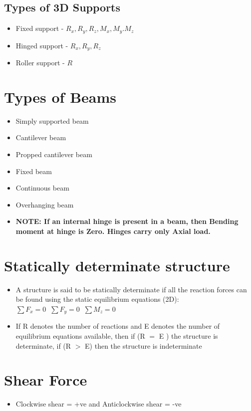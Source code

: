 \documentclass[8pt]{report}
\begin{document}
		\subsection{Types of 3D Supports}
			\begin{itemize}
				\item Fixed support - $R_x,R_y,R_z,M_x,M_y.M_z$
				\item Hinged support - $R_x,R_y,R_z$
				\item Roller support - $R$
			\end{itemize}\hrulefill			%
	\section{Types of Beams}
		\begin{itemize}
			\item Simply supported beam
			\item Cantilever beam
			\item Propped cantilever beam
			\item Fixed beam
			\item Continuous beam
			\item Overhanging beam
			\item \textbf{NOTE: If an internal hinge is present in a beam, then Bending moment at hinge is Zero. Hinges carry only Axial load.}
		\end{itemize}\hrulefill
	\section{Statically determinate structure}
		\begin{itemize}
			\item A structure is said to be statically determinate if all the reaction forces can be found using the static equilibrium equations (2D): $\boxed{\sum F_x=0\;\;\sum F_y=0\;\;\sum M_z=0}$
			\item If R denotes the number of reactions and E denotes the number of equilibrium equations available, then if (R $=$ E ) the structure is determinate, if (R $>$ E) then the structure is indeterminate
		\end{itemize}\hrulefill
	\section{Shear Force}
		\begin{itemize}
			\item Clockwise shear = +ve and Anticlockwise shear = -ve
		\end{itemize}\hrulefill
\end{document}
